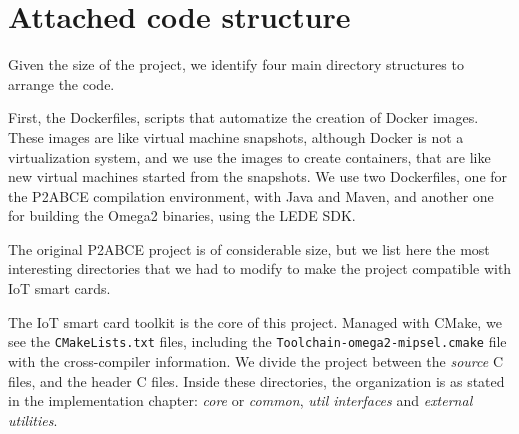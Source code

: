 \chapter{Attached code structure}\label{ch:code}

Given the size of the project, we identify four main directory structures to arrange the code.


First, the Dockerfiles, scripts that automatize the creation of Docker images. These images are like virtual machine snapshots, although Docker is not a virtualization system, and we use the images to create containers, that are like new virtual machines started from the snapshots. We use two Dockerfiles, one for the P2ABCE compilation environment, with Java and Maven, and another one for building the Omega2 binaries, using the LEDE SDK.



\hfil

The original P2ABCE project is of considerable size, but we list here the most interesting directories that we had to modify to make the project compatible with IoT smart cards.

\hfil




\hfil

The IoT smart card toolkit is the core of this project. Managed with CMake, we see the \texttt{CMakeLists.txt} files, including the \texttt{Toolchain-omega2-mipsel.cmake} file with the cross-compiler information. We divide the project between the \textit{source} C files, and the header C files. Inside these directories, the organization is as stated in the implementation chapter: \textit{core} or \textit{common}, \textit{util interfaces} and \textit{external utilities}.

\hfil


